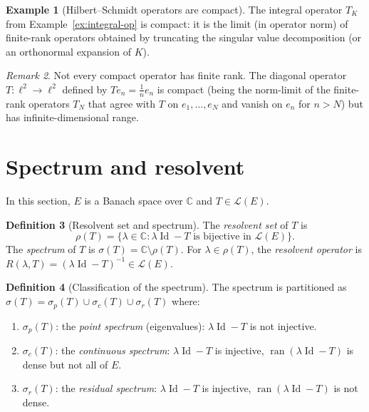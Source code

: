 \documentclass[a4paper,12pt]{book}
\DeclareMathOperator{\Id}{Id}
\DeclareMathOperator{\ran}{ran}
\newcommand{\C}{\mathbb{C}}
\theoremstyle{definition}
\newtheorem{definition}{Definition}[chapter]
\newtheorem{example}[definition]{Example}
\theoremstyle{plain}
\theoremstyle{remark}
\newtheorem{remark}[definition]{Remark}
\begin{document}
\begin{example}[Hilbert--Schmidt operators are compact]
\label{ex:HS-compact}
The integral operator $T_K$ from Example~\ref{ex:integral-op} is compact: it is
the limit (in operator norm) of finite-rank operators obtained by truncating the
singular value decomposition (or an orthonormal expansion of $K$).
\end{example}

\begin{remark}\label{rem:compact-not-finite-rank}
Not every compact operator has finite rank. The diagonal operator
$T\colon\ell^2\to\ell^2$ defined by $T e_n = \frac{1}{n}e_n$ is compact (being
the norm-limit of the finite-rank operators $T_N$ that agree with $T$ on
$e_1,\dots,e_N$ and vanish on $e_n$ for $n>N$) but has infinite-dimensional
range.
\end{remark}

\section{Spectrum and resolvent}

In this section, $E$ is a Banach space over $\C$ and $T\in\mathcal{L}(E)$.

\begin{definition}[Resolvent set and spectrum]\label{def:spectrum}
The \emph{resolvent set} of $T$ is
\[
  \rho(T) = \bigl\{\lambda\in\C : \lambda\Id - T \text{ is bijective in }
  \mathcal{L}(E)\bigr\}.
\]
The \emph{spectrum} of $T$ is $\sigma(T) = \C\setminus\rho(T)$.
For $\lambda\in\rho(T)$, the \emph{resolvent operator}
is $R(\lambda,T) = (\lambda\Id - T)^{-1}\in\mathcal{L}(E)$.
\end{definition}

\begin{definition}[Classification of the spectrum]\label{def:spectrum-parts}
The spectrum is partitioned as $\sigma(T) = \sigma_p(T)\cup\sigma_c(T)\cup\sigma_r(T)$
where:
\begin{enumerate}[label=(\roman*)]
  \item $\sigma_p(T)$: the \emph{point spectrum} (eigenvalues): $\lambda\Id-T$ is
        not injective.
  \item $\sigma_c(T)$: the \emph{continuous spectrum}: $\lambda\Id-T$ is injective,
        $\ran(\lambda\Id-T)$ is dense but not all of $E$.
  \item $\sigma_r(T)$: the \emph{residual spectrum}: $\lambda\Id-T$ is injective,
        $\ran(\lambda\Id-T)$ is not dense.
\end{enumerate}
\end{definition}
\end{document}
